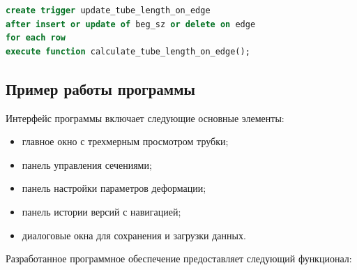 \begin{lstlisting}[caption={Триггер для пересчета длины трубки при изменениях в \texttt{edge}}, label=lst:create_trigger_edge, language=SQL]
create trigger update_tube_length_on_edge
after insert or update of beg_sz or delete on edge
for each row
execute function calculate_tube_length_on_edge();
\end{lstlisting}


\subsection{Пример работы программы}

\noindent
\hspace{1.25cm}
Интерфейс программы включает следующие основные элементы:
\begin{itemize}
    \item главное окно с трехмерным просмотром трубки;
    \item панель управления сечениями;
    \item панель настройки параметров деформации;
    \item панель истории версий с навигацией;
    \item диалоговые окна для сохранения и загрузки данных.
\end{itemize}

\noindent
\hspace{1.25cm}
Разработанное программное обеспечение предоставляет следующий функционал:


